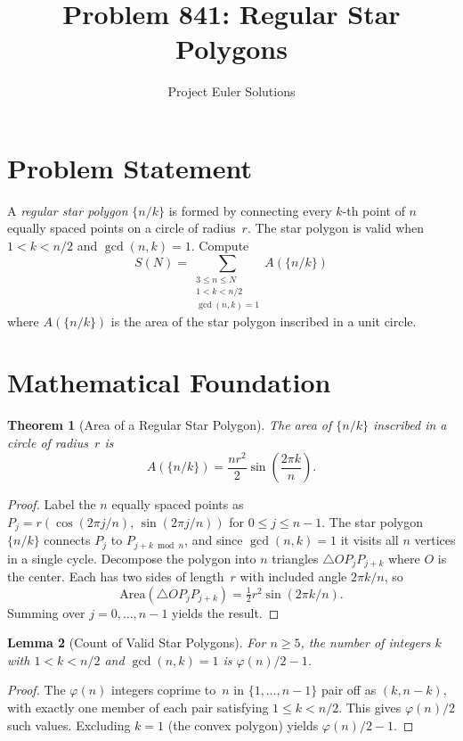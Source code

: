 \documentclass[11pt]{article}
\title{Problem 841: Regular Star Polygons}
\author{Project Euler Solutions}
\date{}
\newtheorem{theorem}{Theorem}
\newtheorem{lemma}[theorem]{Lemma}
\begin{document}
\maketitle

\section{Problem Statement}

A \emph{regular star polygon} $\{n/k\}$ is formed by connecting every $k$-th point of $n$ equally spaced points on a circle of radius~$r$. The star polygon is valid when $1 < k < n/2$ and $\gcd(n,k) = 1$. Compute
\[
S(N) = \sum_{\substack{3 \le n \le N \\ 1 < k < n/2 \\ \gcd(n,k) = 1}} A(\{n/k\})
\]
where $A(\{n/k\})$ is the area of the star polygon inscribed in a unit circle.

\section{Mathematical Foundation}

\begin{theorem}[Area of a Regular Star Polygon]
The area of $\{n/k\}$ inscribed in a circle of radius~$r$ is
\[
A(\{n/k\}) = \frac{nr^2}{2}\sin\!\left(\frac{2\pi k}{n}\right).
\]
\end{theorem}

\begin{proof}
Label the $n$ equally spaced points as $P_j = r(\cos(2\pi j/n),\, \sin(2\pi j/n))$ for $0 \le j \le n-1$. The star polygon $\{n/k\}$ connects $P_j$ to $P_{j+k \bmod n}$, and since $\gcd(n,k)=1$ it visits all $n$ vertices in a single cycle. Decompose the polygon into $n$ triangles $\triangle O P_j P_{j+k}$ where $O$ is the center. Each has two sides of length~$r$ with included angle $2\pi k/n$, so
\[
\mathrm{Area}(\triangle O P_j P_{j+k}) = \tfrac{1}{2}r^2 \sin(2\pi k/n).
\]
Summing over $j = 0, \ldots, n-1$ yields the result.
\end{proof}

\begin{lemma}[Count of Valid Star Polygons]
For $n \ge 5$, the number of integers $k$ with $1 < k < n/2$ and $\gcd(n,k)=1$ is $\varphi(n)/2 - 1$.
\end{lemma}

\begin{proof}
The $\varphi(n)$ integers coprime to~$n$ in $\{1, \ldots, n-1\}$ pair off as $(k, n-k)$, with exactly one member of each pair satisfying $1 \le k < n/2$. This gives $\varphi(n)/2$ such values. Excluding $k = 1$ (the convex polygon) yields $\varphi(n)/2 - 1$.
\end{proof}
\end{document}
